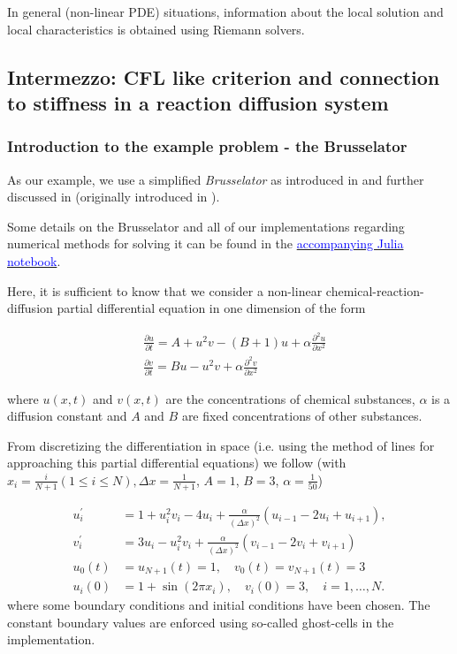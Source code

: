 In general (non-linear PDE) situations, information about the local solution and
local characteristics is obtained using Riemann solvers.

\subsection{Intermezzo: CFL like criterion and connection to stiffness in a reaction diffusion system}
\subsubsection*{Introduction to the example problem - the Brusselator}
As our example, we use a simplified \textit{Brusselator} as introduced in \cite[chapter I.16]{hairer93} and further discussed in \cite[chapter IV.1]{Hairer1996} (originally introduced in \cite{lefever71}).

Some details on the Brusselator and all of our implementations regarding numerical methods for solving it can be found in the \href{https://github.com/leo1200/diffeq/blob/master/efficiently_solfving_stiff_differential_equations.ipynb}{\textcolor{blue}{accompanying Julia notebook}}.

Here, it is sufficient to know that we consider a non-linear chemical-reaction-diffusion partial differential equation in one dimension of the form

\[
\begin{aligned}
& \frac{\partial u}{\partial t}=A+u^2 v-(B+1) u+\alpha \frac{\partial^2 u}{\partial x^2} \\
& \frac{\partial v}{\partial t}=B u-u^2 v+\alpha \frac{\partial^2 v}{\partial x^2}
\end{aligned}
\]

where $u(x,t)$ and $v(x,t)$ are the concentrations of chemical substances, $\alpha$ is a diffusion constant and $A$ and $B$ are fixed concentrations of other substances.

From discretizing the differentiation in space (i.e. using the method of lines for approaching this partial differential equations) we follow (with $x_i = \frac{i}{N+1} (1 \le i \le N), \Delta x = \frac{1}{N+1}$, $A = 1$, $B = 3$, $\alpha = \frac{1}{50}$)

\begin{equation}
  \label{eqn:brusselator}
  \begin{aligned}
  u_i^{\prime} & =1+u_i^2 v_i-4 u_i+\frac{\alpha}{(\Delta x)^2}\left(u_{i-1}-2 u_i+u_{i+1}\right), \\
  v_i^{\prime} & =3 u_i-u_i^2 v_i+\frac{\alpha}{(\Delta x)^2}\left(v_{i-1}-2 v_i+v_{i+1}\right) \\
  u_0(t) & =u_{N+1}(t)=1, \quad v_0(t)=v_{N+1}(t)=3 \\
  u_i(0) & =1+\sin \left(2 \pi x_i\right), \quad v_i(0)=3, \quad i=1, \ldots, N .
  \end{aligned}
\end{equation}
where some boundary conditions and initial conditions have been chosen. The constant boundary values are enforced using so-called ghost-cells in the implementation.

